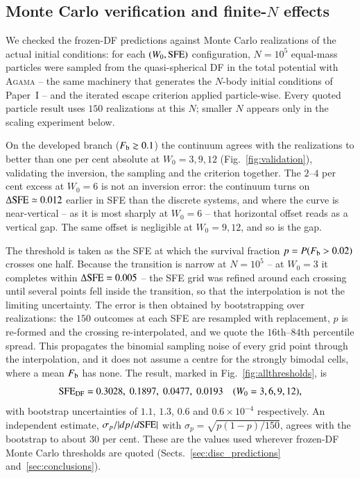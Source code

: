 \documentclass{aa}
\newcommand{\sfe}{{\rm SFE}}
\begin{document}
\subsection{Monte Carlo verification and finite-$N$ effects}
\label{sec:mc}

We checked the frozen-DF predictions against Monte Carlo realizations of
the actual initial conditions: for each $(W_0,\sfe)$ configuration,
$N=10^5$ equal-mass particles were sampled from the quasi-spherical DF in
the total potential with \textsc{Agama} \citep{Vasiliev2019} -- the same
machinery that generates the $N$-body initial conditions of Paper~I --
and the iterated escape criterion applied particle-wise. Every quoted
particle result uses $150$ realizations at this $N$; smaller $N$ appears
only in the scaling experiment below.

On the developed branch ($F_{\rm b}\gtrsim0.1$) the continuum agrees with
the realizations to better than one per cent absolute at $W_0=3,9,12$
(Fig.~\ref{fig:validation}), validating the inversion, the sampling and
the criterion together. The $2$--$4$ per cent excess at $W_0=6$ is not an
inversion error: the continuum turns on $\Delta\sfe\simeq0.012$ earlier
in SFE than the discrete systems, and where the curve is near-vertical --
as it is most sharply at $W_0=6$ -- that horizontal offset reads as a
vertical gap. The same offset is negligible at $W_0=9,12$, and so is the
gap.

The threshold is taken as the SFE at which the survival fraction
$p=P(F_{\rm b}>0.02)$ crosses one half. Because the transition is narrow
at $N=10^5$ -- at $W_0=3$ it completes within $\Delta\sfe=0.005$ -- the
SFE grid was refined around each crossing until several points fell
inside the transition, so that the interpolation is not the limiting
uncertainty. The error is then obtained by bootstrapping over
realizations: the $150$ outcomes at each SFE are resampled with
replacement, $p$ is re-formed and the crossing re-interpolated, and we
quote the $16$th--$84$th percentile spread. This propagates the binomial
sampling noise of every grid point through the interpolation, and it
does not assume a centre for the strongly bimodal cells, where a mean
$F_{\rm b}$ has none. The result, marked in
Fig.~\ref{fig:allthresholds}, is
\begin{equation}
  \sfe_{\rm DF} = 0.3028,\; 0.1897,\; 0.0477,\; 0.0193
  \quad (W_0=3,6,9,12),
  \label{eq:mcthresh}
\end{equation}
with bootstrap uncertainties of $1.1$, $1.3$, $0.6$ and
$0.6\times10^{-4}$ respectively. An independent estimate,
$\sigma_p/|dp/d\sfe|$ with $\sigma_p=\sqrt{p(1-p)/150}$, agrees with the
bootstrap to about $30$ per cent. These are the values used wherever
frozen-DF Monte Carlo thresholds are quoted
(Sects.~\ref{sec:disc_predictions} and~\ref{sec:conclusions}).
\end{document}

